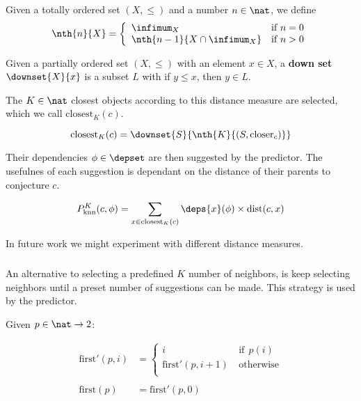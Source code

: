 \begin{definition}\label{def:nth}
  Given a totally ordered set $(X, \leq)$ and a number $n \in \nat$, we define
  $$
    \nth{n}{X} = \left\{
      \begin{array}{ll}
        \infimum_X & \text{if}~n = 0 \\
        \nth{n-1}{X \cap \infimum_X} & \text{if}~n > 0 \\
      \end{array}
    \right.
  $$
\end{definition}

\begin{definition}\label{def:downset}
  Given a partially ordered set $(X, \leq)$ with an element $x \in X$, a \textbf{down set} $\downset{X}{x}$ is a subset $L$ with if $y \leq x$, then $y \in L$.
\end{definition}

The $K \in \nat$ closest objects according to this distance measure are selected, which we call $\text{closest}_K(c)$.
\begin{definition}
  $$
    \text{closest}_K(c) = \downset{S}{\nth{K}{(S, \text{closer}_c)}}
  $$
\end{definition}

Their dependencies $\phi \in \depset$ are then suggested by the predictor.
The usefulnes of each suggestion is dependant on the distance of their parents to conjecture $c$.
\begin{definition}
  $$
    P^K_\text{knn}(c, \phi) = \sum_{x \in \text{closest}_K(c)} \deps{x}(\phi) \times \text{dist}(c, x)
  $$
\end{definition}

In future work we might experiment with different distance measures.

\subsubsection{\knnadaptive}


An alternative to selecting a predefined $K$ number of neighbors, is keep selecting neighbors until a preset number of suggestions can be made.
This strategy is used by the \knnadaptive predictor.

\begin{definition}
  Given $p \in \nat \rightarrow 2$:

  $$
    \begin{array}{ll}
      \text{first}'(p, i) & = \left\{
      \begin{array}{ll}
         i & ~\text{if}~~ p(i) \\
         \text{first}'(p, i+1) & ~\text{otherwise} \\
      \end{array}
      \right. \\
      \\
      \text{first}(p) & = \text{first}'(p, 0)
    \end{array}
  $$
\end{definition}

